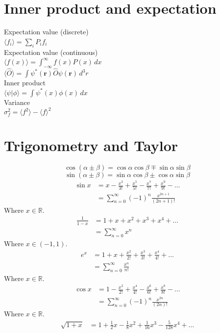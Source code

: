 \documentclass[12pt,a4paper]{article}
\begin{document}
	
	\section*{Inner product and expectation}
	\begin{center}
		Expectation value (discrete) \\[.15in]
		\(\langle f_i \rangle = \sum_{i} P_i f_i\) \\[.25in]
		Expectation value (continuous) \\[.15in]
		\(\langle f(x) \rangle = \int_{-\infty}^{\infty} f(x) P(x) \, dx\) \\[.15in]
		\(\langle \hat{O} \rangle = \int \psi^*(\mathbf{r}) \hat{O} \psi(\mathbf{r}) \, d^3r\) \\[.25in]
		Inner product \\[.15in]
		\(\langle \psi | \phi \rangle = \int \psi^*(x) \phi(x) \, dx\) \\[.25in]
		Variance \\[.15in]
		\(\sigma_f^2 = \langle f^2 \rangle - \langle f \rangle^2\)
	\end{center}	
	
	\section*{Trigonometry and Taylor}
\begin{equation*}
	\cos(\alpha \pm \beta) = \cos \alpha \cos \beta \mp \sin \alpha \sin \beta
\end{equation*}
\begin{equation*}
	\sin(\alpha \pm \beta) = \sin \alpha \cos \beta \pm \cos \alpha \sin \beta
\end{equation*}
\begin{align*}
	\sin x &= x - \frac{x^3}{3!} + \frac{x^5}{5!} - \frac{x^7}{7!} + \frac{x^9}{9!} - \dotso \\
	&= \sum_{n=0}^\infty (-1)^n \frac{x^{2n + 1}}{(2n + 1)!}
\end{align*}
Where \(x \in \mathbb{R}\).
\begin{align*}
	\frac{1}{1-x} &= 1 + x + x^2 + x^3 + x^4 + \dotso \\
	&= \sum_{n=0}^\infty x^n
\end{align*}
Where \(x \in (-1,1)\).
\begin{align*}
	e^x &= 1 + x + \frac{x^2}{2!} + \frac{x^3}{3!} + \frac{x^4}{4!} + \dotso \\
	&= \sum_{n=0}^\infty \frac{x^n}{n!}
\end{align*}
Where \(x \in \mathbb{R}\).
\begin{align*}
	\cos x &= 1 - \frac{x^2}{2!} + \frac{x^4}{4!} - \frac{x^6}{6!} + \frac{x^8}{8!} - \dotso \\
	&= \sum_{n=0}^\infty (-1)^n \frac{x^{2n}}{(2n)!}
\end{align*}
Where \(x \in \mathbb{R}\).
\begin{align*}
	\sqrt{1 + x} &= 1 + \frac{1}{2}x - \frac{1}{8}x^2 + \frac{1}{16}x^3 - \frac{5}{128}x^4 + \dots \\
\end{align*}
\end{document}
